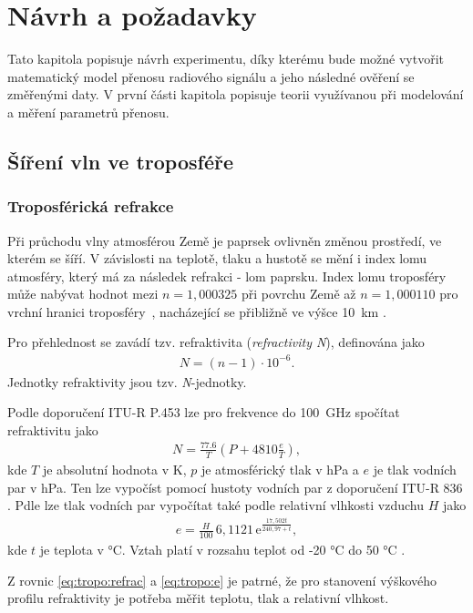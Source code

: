 \documentclass[twoside]{ctuthesis}
\newcommand{\mt}[1]{\text{#1}}
\theoremstyle{plain}
\theoremstyle{definition}
\theoremstyle{note}
\begin{document}
	

\chapter{Návrh a požadavky}
	Tato kapitola popisuje návrh experimentu, díky kterému bude možné vytvořit matematický model přenosu radiového signálu a jeho následné ověření se změřenými daty. V první části kapitola popisuje teorii využívanou při modelování a měření parametrů přenosu. 
	\section{Šíření vln ve troposféře}
		\subsection{Troposférická refrakce}
		Při průchodu vlny atmosférou Země je paprsek ovlivněn změnou prostředí, ve kterém se šíří. V závislosti na teplotě, tlaku a hustotě se mění i index lomu atmosféry, který má za následek refrakci - lom paprsku. Index lomu troposféry může nabývat hodnot mezi $n=1{,}000325$ při povrchu Země až $n=1{,}000110$ pro vrchní hranici troposféry~\cite{zaklady:sireni:vln}, nacházející se přibližně ve výšce 10~km \cite{web_tropo}.

		Pro přehlednost se zavádí tzv. refraktivita (\textit{refractivity N}), definována jako
		\begin{align}
			N = (n-1)\cdot 10^{-6}.
		\end{align}
		Jednotky refraktivity jsou tzv. \textit{N}-jednotky.

		Podle doporučení ITU-R P.453 \cite{ITU:refrac} lze pro frekvence do 100~GHz spočítat refraktivitu jako
		\begin{align}
			N = \frac{77.6}{T} \left(P + 4810\frac{e}{T}\right),
			\label{eq:tropo:refrac}
		\end{align}
		kde $T$ je absolutní hodnota v K, $p$ je atmosférický tlak v hPa a $e$ je tlak vodních par v hPa. Ten lze vypočíst pomocí hustoty vodních par z doporučení ITU-R 836 \cite{ITU:vapour}. Pdle \cite{ITU:refrac} lze tlak vodních par vypočítat také podle relativní vlhkosti vzduchu $H$ jako
		\begin{align}
			e = \frac{H}{100}\,6{,}1121\,\mt{e}^{\frac{17{,}502t}{240{,}97 + t}},
			\label{eq:tropo:e}
		\end{align}
		kde $t$ je teplota v °C. Vztah platí v rozsahu teplot od -20 °C do 50 °C \cite{zaklady:sireni:vln}.

		Z rovnic \eqref{eq:tropo:refrac} a \eqref{eq:tropo:e} je patrné, že pro stanovení výškového profilu refraktivity je potřeba měřit teplotu, tlak a relativní vlhkost. 
\end{document}
